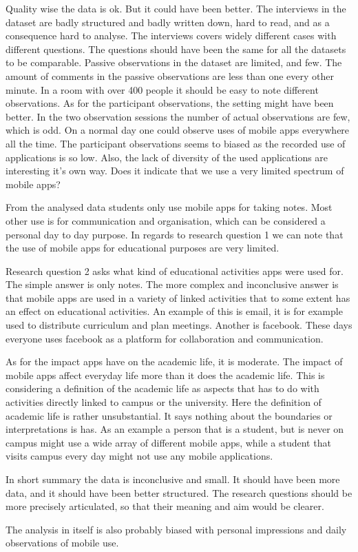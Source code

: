 \documentclass[12pt, a4paper]{article}
\begin{document}
Quality wise the data is ok. But it could have been better. 
The interviews in the dataset are badly structured and badly written down, hard to
read, and as a consequence hard to analyse. The interviews covers widely
different cases with different questions. The questions should have been the
same for all the datasets to be comparable. Passive observations in the dataset
are limited, and few. The amount of comments in the passive observations are
less than one every other minute. In a room with over 400 people it should be
easy to note different observations. As for the participant observations, the
setting might have been better. In the two observation sessions the number of
actual observations are few, which is odd. On a normal day one could observe
uses of mobile apps everywhere all the time. The participant observations seems
to biased as the recorded use of applications is so low. Also, the lack of diversity of
the used applications are interesting it's own way. Does it indicate that we
use a very limited spectrum of mobile apps?  

From the analysed data students only use mobile apps for taking notes. Most
other use is for communication and organisation, which can be considered a
personal day to day purpose. In regards to research question 1 we can note that
the use of mobile apps for educational purposes are very limited.  

Research question 2 asks what kind of educational activities apps were used for. The simple  
answer is only notes. The more complex and inconclusive answer is that mobile
apps are used in a variety of linked activities that to some extent has an
effect on educational activities. An example of this is email, it is for
example used to distribute curriculum and plan meetings. Another is facebook.
These days everyone uses facebook as a platform for collaboration and
communication. 

As for the impact apps have on the academic life, it is moderate. The impact of
mobile apps affect everyday life more than it does the academic life. This is
considering a definition of the academic life as aspects that has to do with
activities directly linked to campus or the university. Here the definition of
academic life is rather unsubstantial. It says nothing about the boundaries or
interpretations is has. As an example a person that is a student, but is never
on campus might use a wide array of different mobile apps, while a student that
visits campus every day might not use any mobile applications.  

In short summary the data is inconclusive and small. It should have been more
data, and it should have been better structured.
The research questions should be more precisely articulated, so that their
meaning and aim would be clearer.

The analysis in itself is also probably biased with personal impressions and
daily observations of mobile use.   
\end{document}
